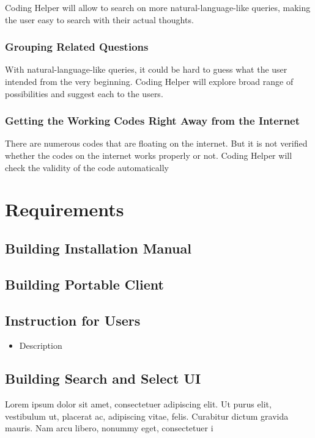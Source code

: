 \documentclass[conference]{IEEEtran}
\begin{document}
Coding Helper will allow to search on more natural-language-like queries, making the user easy to search with their actual thoughts.

\subsubsection{Grouping Related Questions}
With natural-language-like queries, it could be hard to guess what the user intended from the very beginning. Coding Helper will explore broad range of possibilities and suggest each to the users.

\subsubsection{Getting the Working Codes Right Away from the Internet}
There are numerous codes that are floating on the internet. But it is not verified whether the codes on the internet works properly or not. Coding Helper will check the validity of the code automatically 


\section{Requirements} %
\label{sec:requirements}


\subsection{Building Installation Manual}
\textit{ }

\subsection{Building Portable Client}
\textit{ }

\subsection{Instruction for Users}
\begin{itemize}
  \item Description
\end{itemize}
\textit{ }

\subsection{Building Search and Select UI}
Lorem ipsum dolor sit amet, consectetuer adipiscing elit. Ut
purus elit, vestibulum ut, placerat ac, adipiscing vitae, felis.
Curabitur dictum gravida mauris. Nam arcu libero, nonummy
eget, consectetuer i 
\end{document}
